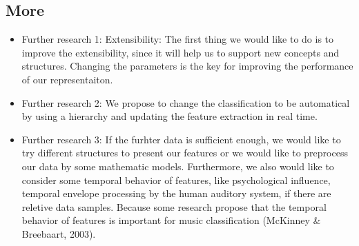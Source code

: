 \documentclass[a4paper,12pt]{article}
\begin{document}
\subsection{More}

\begin{itemize}
    \item Further research 1: Extensibility: The first thing we would like to do is to improve the extensibility, since it will help us to support new concepts and structures. Changing the parameters is the key for improving the performance of our representaiton. 
    \item Further research 2: We propose to change the classification to be automatical by using a hierarchy and updating the feature extraction in real time.
    \item Further research 3: If the furhter data is sufficient enough, we would like to try different structures to present our features or we would like to preprocess our data by some mathematic models. Furthermore, we also would like to consider some temporal behavior of features, like psychological influence, temporal envelope processing by the human auditory system, if there are reletive data samples. Because some research propose that the temporal behavior of features is important for music classification (McKinney & Breebaart, 2003).
\end{itemize}


\end{document}
